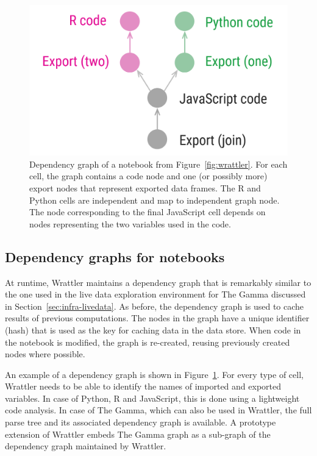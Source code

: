\documentclass[fleqn,11pt]{report}
\theoremstyle{definition}
\begin{document}
\begin{figure}[t]
\begin{minipage}{.5\textwidth}
\hspace{-1em}
\includegraphics[scale=0.2]{img/graph.png}
\end{minipage}%
\begin{minipage}{0.5\textwidth}
\caption{Dependency graph of a notebook from Figure~\ref{fig:wrattler}. For each cell,
the graph contains a code node and one (or possibly more) export nodes that represent exported
data frames. The R and Python cells are independent and map to independent graph node. The node
corresponding to the final JavaScript cell depends on nodes representing the two variables used
in the code.}
\label{fig:deps}
\end{minipage}
\end{figure}

\subsection{Dependency graphs for notebooks}

At runtime, Wrattler maintains a dependency graph that is remarkably similar to the one
used in the live data exploration environment for The Gamma discussed in
Section~\ref{sec:infra-livedata}. As before, the dependency graph is used to cache results
of previous computations. The nodes in the graph have a unique identifier (hash) that is used
as the key for caching data in the data store. When code in the notebook is modified, the
graph is re-created, reusing previously created nodes where possible.

An example of a dependency graph is shown in Figure~\ref{fig:deps}. For every type of
cell, Wrattler needs to be able to identify the names of imported and exported variables.
In case of Python, R and JavaScript, this is done using a lightweight code analysis.
In case of The Gamma, which can also be used in Wrattler, the full
parse tree and its associated dependency graph is available. A prototype extension of Wrattler
embeds The Gamma graph as a sub-graph of the dependency graph maintained by Wrattler.
\end{document}
